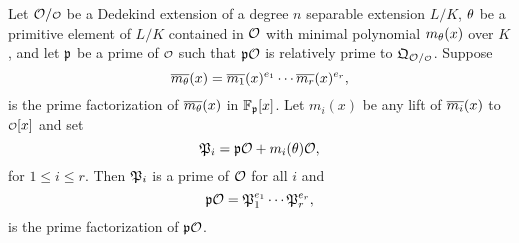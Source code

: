     \begin{theorem*}
      Let $\mc{O}/\smc{O}$ be a Dedekind extension of a degree $n$ separable extension $L/K$, $\theta$ be a primitive element of $L/K$ contained in $\mathcal{O}$ with minimal polynomial $m_{\theta}(x)$ over $K$, and let $\mathfrak{p}$ be a prime of $\smc{O}$ such that $\mathfrak{p}\mathcal{O}$ is relatively prime to $\mf{Q}_{\mc{O}/\smc{O}}$. Suppose
      \[
        \overline{m_{\theta}}(x) = \overline{m_{1}}(x)^{e_{1}} \cdots \overline{m_{r}}(x)^{e_{r}},
      \]
      is the prime factorization of $\overline{m_{\theta}}(x)$ in $\mathbb{F}_{\mathfrak{p}}[x]$. Let $m_{i}(x)$ be any lift of $\overline{m_{i}}(x)$ to $\smc{O}[x]$ and set
      \[
        \mathfrak{P}_{i} = \mathfrak{p}\mathcal{O}+m_{i}(\theta)\mathcal{O},
      \]
      for $1 \le i \le r$. Then $\mathfrak{P}_{i}$ is a prime of $\mathcal{O}$ for all $i$ and
      \[
        \mathfrak{p}\mathcal{O} = \mathfrak{P}_{1}^{e_{1}} \cdots \mathfrak{P}_{r}^{e_{r}},
      \]
      is the prime factorization of $\mathfrak{p}\mathcal{O}$.
    \end{theorem*}
